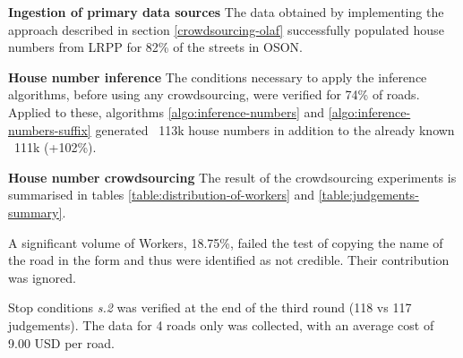 \textbf{Ingestion of primary data sources} The data obtained by implementing the approach described in section \ref{crowdsourcing-olaf} successfully populated house numbers from LRPP for 82\% of the streets in OSON.

\textbf{House number inference} The conditions necessary to apply the inference algorithms, before using any crowdsourcing, were verified for 74\% of roads. Applied to these, algorithms \ref{algo:inference-numbers} and \ref{algo:inference-numbers-suffix} generated ~113k house numbers in addition to the already known ~111k (+102\%). 

\textbf{House number crowdsourcing} The result of the crowdsourcing experiments is summarised in tables \ref{table:distribution-of-workers} and \ref{table:judgements-summary}. 

A significant volume of Workers, 18.75\%, failed the test of copying the name of the road in the form and thus were identified as not credible. Their contribution was ignored. 

Stop conditions {\it s.2} was verified at the end of the third round (118 vs 117 judgements). The data for 4 roads only was collected, with an average cost of 9.00 USD per road.

